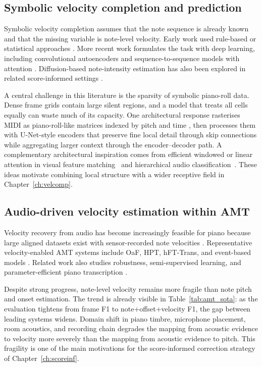 \subsection{Symbolic velocity completion and prediction}
\label{sec:bg:velocity:symbolic}

Symbolic velocity completion assumes that the note sequence is already known and that the missing variable is note-level velocity. Early work used rule-based or statistical approaches \cite{berndt2010modelling}. More recent work formulates the task with deep learning, including convolutional autoencoders and sequence-to-sequence models with attention \cite{kuo2021velocity,kim2023piano}. Diffusion-based note-intensity estimation has also been explored in related score-informed settings \cite{kim2023diffvel}.

A central challenge in this literature is the sparsity of symbolic piano-roll data. Dense frame grids contain large silent regions, and a model that treats all cells equally can waste much of its capacity. One architectural response rasterises MIDI as piano-roll-like matrices indexed by pitch and time \cite{he2025filling}, then processes them with U-Net-style encoders that preserve fine local detail through skip connections while aggregating larger context through the encoder--decoder path. A complementary architectural inspiration comes from efficient windowed or linear attention in visual feature matching~\cite{shen2023linear} and hierarchical audio classification~\cite{chen2022hts}. These ideas motivate combining local structure with a wider receptive field in Chapter~\ref{ch:velcomp}.

\subsection{Audio-driven velocity estimation within AMT}
\label{sec:bg:velocity:amt}

Velocity recovery from audio has become increasingly feasible for piano because large aligned datasets exist with sensor-recorded note velocities \cite{hawthorne2019maestro}. Representative velocity-enabled AMT systems include OaF, HPT, hFT-Trans, and event-based models \cite{hawthorne2018onsets,hawthorne2021trans,kong2021hpt,toyama2023hft,yan2021semicrf,yan2024semicrf}. Related work also studies robustness, semi-supervised learning, and parameter-efficient piano transcription \cite{maman2022general,edwards2024general,strahl2024semi,wei2022hppnet,wang2025multitask}.

Despite strong progress, note-level velocity remains more fragile than note pitch and onset estimation. The trend is already visible in Table~\ref{tab:amt_sota}: as the evaluation tightens from frame F1 to note$+$offset$+$velocity F1, the gap between leading systems widens. Domain shift in piano timbre, microphone placement, room acoustics, and recording chain degrades the mapping from acoustic evidence to velocity more severely than the mapping from acoustic evidence to pitch. This fragility is one of the main motivations for the score-informed correction strategy of Chapter~\ref{ch:scoreinf}.

